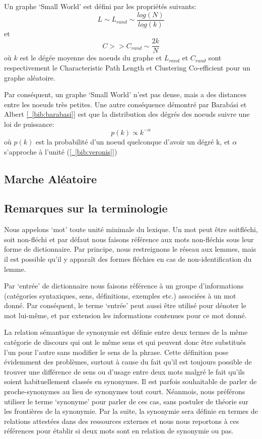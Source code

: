 Un graphe `Small World' est défini par les propriétés suivants:
$$L \sim L_{rand} \sim \frac{log(N)}{log(k)} $$
et
$$C >> C_{rand} \sim \frac{2k}{N} $$
où $k$ est le dégée moyenne des noeuds du graphe et $L_{rand}$ et $C_{rand}$ sont respectivement
le Characteristic Path Length et Clustering Co-efficient pour un graphe aléatoire.

Par conséquent, un graphe `Small World' n'est pas dense, mais a des distances entre les noeuds
très petites. Une autre conséquence démontré par Barabási et Albert
\hyperref[bib:barabasi]{[~\ref*{bib:barabasi}]} est que la distribution des dégrés
des noeuds suivre une loi de puissance:
$$ p(k) \propto k^{-\alpha}$$
où $p(k)$ est la probabilité d'un noeud quelconque d'avoir un dégré k, et
$\alpha$ s'approche à l'unité (\hyperref[bib:veronis]{[~\ref*{bib:veronis}]})


\subsection{ Marche Aléatoire }



\subsection{Remarques sur la terminologie}
Nous appelons `mot' toute unité minimale du lexique. Un mot peut être
soitfléchi, soit non-fléchi et par défaut nous faisons référence aux mots 
non-fléchis sous leur forme de dictionnaire. Par principe, nous restreignons le 
réseau aux lemmes, mais il est possible qu'il y apparaît des formes fléchies en 
cas de non-identification du lemme.

Par `entrée' de dictionnaire nous faisons référence à un groupe d'informations 
(catégories syntaxiques, sens, définitions, exemples etc.) associées à un mot 
donné. Par conséquent, le terme `entrée' peut aussi être utilisé pour dénoter 
le mot lui-même, et par extension les informations contenues pour ce mot donné.

La relation sémantique de synonymie est définie entre deux termes de la même 
catégorie de discours qui ont le même sens et qui peuvent donc être substitués 
l'un pour l'autre sans modifier le sens de la phrase. Cette définition pose 
évidemment des problèmes, surtout à cause du fait qu'il est toujours possible 
de trouver une différence de sens ou d'usage entre deux mots malgré le fait 
qu'ils soient habituellement classés en synonymes. Il est parfois souhaitable 
de parler de proche-synonymes au lieu de synonymes tout court. Néanmois, 
nous préférons utiliser le terme `synonyme' pour parler de ces cas, sans 
postuler de théorie sur les frontières de la synonymie. Par la suite, la 
synonymie sera définie en termes de relations attestées dans des ressources 
externes et nous nous reportons à ces références pour établir si deux mots sont 
en relation de synonymie ou pas.

